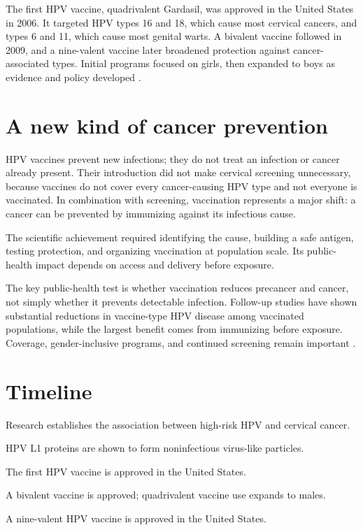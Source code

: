\documentclass[12pt,oneside]{book}
\begin{document}
The first HPV vaccine, quadrivalent Gardasil, was approved in the United
States in 2006. It targeted HPV types 16 and 18, which cause most cervical
cancers, and types 6 and 11, which cause most genital warts. A bivalent
vaccine followed in 2009, and a nine-valent vaccine later broadened protection
against cancer-associated types. Initial programs focused on girls, then
expanded to boys as evidence and policy developed
\cite{fdaHPVApproval,nciHPVVaccine}.

\section{A new kind of cancer prevention}
HPV vaccines prevent new infections; they do not treat an infection or cancer already present. Their introduction did not make cervical screening unnecessary, because vaccines do not cover every cancer-causing HPV type and not everyone is vaccinated. In combination with screening, vaccination represents a major shift: a cancer can be prevented by immunizing against its infectious cause.

The scientific achievement required identifying the cause, building a safe
antigen, testing protection, and organizing vaccination at population scale.
Its public-health impact depends on access and delivery before exposure.

The key public-health test is whether vaccination reduces precancer and
cancer, not simply whether it prevents detectable infection. Follow-up studies
have shown substantial reductions in vaccine-type HPV disease among vaccinated
populations, while the largest benefit comes from immunizing before exposure.
Coverage, gender-inclusive programs, and continued screening remain important
\cite{nciHPVVaccine,fdaHPVApproval}.

\section*{Timeline}
\begin{description}[leftmargin=2.3cm,style=nextline]
  \item[1970s--1980s] Research establishes the association between high-risk HPV and cervical cancer.
  \item[Early 1990s] HPV L1 proteins are shown to form noninfectious virus-like particles.
  \item[2006] The first HPV vaccine is approved in the United States.
  \item[2009] A bivalent vaccine is approved; quadrivalent vaccine use expands to males.
  \item[2014] A nine-valent HPV vaccine is approved in the United States.
\end{description}
\end{document}
